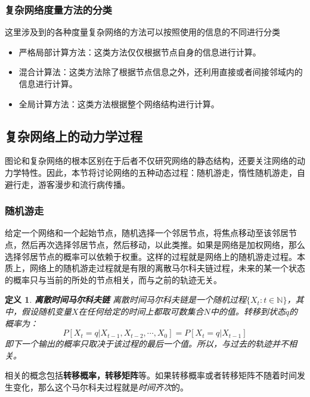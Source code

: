 \documentclass{ctexart}
\newtheorem{Definition}{\hspace{2em}定义}[section]
\begin{document}
            \subsubsection{复杂网络度量方法的分类}
                这里涉及到的各种度量复杂网络的方法可以按照使用的信息的不同进行分类
                \begin{itemize}
                    \item 严格局部计算方法：这类方法仅仅根据节点自身的信息进行计算。
                    \item 混合计算法：这类方法除了根据节点信息之外，还利用直接或者间接邻域内的信息进行计算。
                    \item 全局计算方法：这类方法根据整个网络结构进行计算。
                \end{itemize}

        \subsection{复杂网络上的动力学过程}
            图论和复杂网络的根本区别在于后者不仅研究网络的静态结构，还要关注网络的动力学特性。因此，本节将讨论网络的五种动态过程：随机游走，惰性随机游走，自避行走，游客漫步和流行病传播。

            \subsubsection{随机游走}
                给定一个网络和一个起始节点，随机选择一个邻居节点，将焦点移动至该邻居节点，然后再次选择邻居节点，然后移动，以此类推。如果是网络是加权网络，那么选择邻居节点的概率可以依赖于权重。这样的过程就是网络上的随机游走过程。本质上，网络上的随机游走过程就是有限的离散马尔科夫链过程，未来的某一个状态的概率只与当前的所处的节点相关，而与之前的轨迹无关。
                \begin{Definition}
                    \textbf{离散时间马尔科夫链} 离散时间马尔科夫链是一个随机过程$\{X_t:t\in \mathbb{N}\}$，其中，假设随机变量$X$在任何给定的时间上都取可数集合$N$中的值。转移到状态$q$的概率为：
                    $$
                        P[X_t=q|X_{t-1},X_{t-2},\cdots,X_0] = P[X_t=q|X_{t-1}]
                    $$
                    即下一个输出的概率只取决于该过程的最后一个值。所以，与过去的轨迹并不相关。
                \end{Definition}
                相关的概念包括\textbf{转移概率，转移矩阵}等。如果转移概率或者转移矩阵不随着时间发生变化，那么这个马尔科夫过程就是\emph{时间齐次}的。
\end{document}
